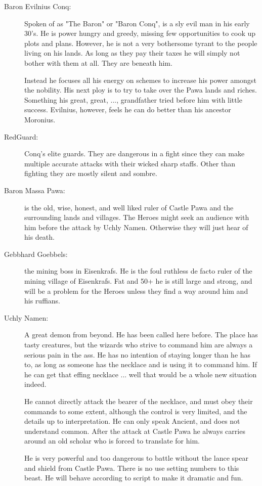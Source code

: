 \begin{description}
\item[Baron Evilnius Conq:] Spoken of as "The Baron" or "Baron Conq", is a sly evil man in his early 30's. He is power hungry and greedy, missing few opportunities to cook up plots and plans. However, he is not a very bothersome tyrant to the people living on his lands. As long as they pay their taxes he will simply not bother with them at all. They are beneath him.

Instead he focuses all his energy on schemes to increase his power amongst the nobility. His next ploy is to try to take over the Pawa lands and riches. Something his great, great, ..., grandfather tried before him with little success. Evilnius, however, feels he can do better than his ancestor Moronius.


\item[RedGuard:] Conq's elite guards. They are dangerous in a fight since they can make multiple accurate attacks with their wicked sharp staffs. Other than fighting they are mostly silent and sombre.


\item[Baron Massa Pawa:] is the old, wise, honest, and well liked ruler of Castle Pawa and the surrounding lands and villages. The Heroes might seek an audience with him before the attack by Uchly Namen. Otherwise they will just hear of his death.


\item[Gebbhard Goebbels:] the mining boss in Eisenkrafs. He is the foul ruthless de facto ruler of the mining village of Eisenkrafs. Fat and 50+ he is still large and strong, and will be a problem for the Heroes unless they find a way around him and his ruffians.


\item[Uchly Namen:] A great demon from beyond. He has been called here before. The place has tasty creatures, but the wizards who strive to command him are always a serious pain in the ass. He has no intention of staying longer than he has to, as long as someone has the necklace and is using it to command him. If he can get that effing necklace ... well that would be a whole new situation indeed.

He cannot directly attack the bearer of the necklace, and must obey their commands to some extent, although the control is very limited, and the details up to interpretation. He can only speak Ancient, and does not understand common. After the attack at Castle Pawa he always carries around an old scholar who is forced to translate for him.

He is very powerful and too dangerous to battle without the lance spear and shield from Castle Pawa. There is no use setting numbers to this beast. He will behave according to script to make it dramatic and fun.

\end{description}















